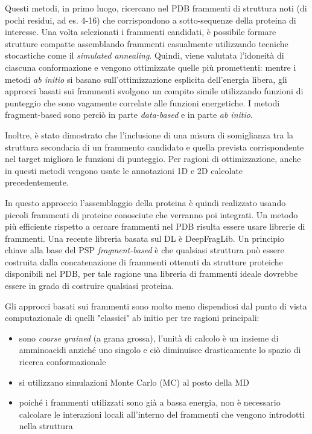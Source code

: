 {Questi metodi, in primo luogo, ricercano nel PDB frammenti di struttura noti (di pochi residui, ad es. 4-16) che corrispondono a sotto-sequenze della proteina di interesse. Una volta selezionati i frammenti candidati, è possibile formare strutture compatte assemblando frammenti casualmente utilizzando tecniche stocastiche come il \textit{simulated annealing}. Quindi, viene valutata l'idoneità di ciascuna conformazione e vengono ottimizzate quelle più promettenti: mentre i metodi \textit{ab initio} si basano sull'ottimizzazione esplicita dell'energia libera, gli approcci basati sui frammenti svolgono un compito simile utilizzando funzioni di punteggio che sono vagamente correlate alle funzioni energetiche\supercite{abbass2020enhancing}. I metodi fragment-based sono perciò in parte \textit{data-based} e in parte \textit{ab initio}.

\par Inoltre, è stato dimostrato che l'inclusione di una misura di somiglianza tra la struttura secondaria di un frammento candidato e quella prevista corrispondente nel target migliora le funzioni di punteggio. Per ragioni di ottimizzazione, anche in questi metodi vengono usate le annotazioni 1D e 2D calcolate precedentemente.

\par In questo approccio l'assemblaggio della proteina è quindi realizzato usando piccoli frammenti di proteine conosciute che verranno poi integrati. Un metodo più efficiente rispetto a cercare frammenti nel PDB risulta essere usare librerie di frammenti. Una recente libreria basata sul DL è DeepFragLib. Un principio chiave alla base del PSP \textit{fragment-based} è che qualsiasi struttura può essere costruita dalla concatenazione di frammenti ottenuti da strutture proteiche disponibili nel PDB, per tale ragione una libreria di frammenti ideale dovrebbe essere in grado di costruire qualsiasi proteina. \\


\par Gli approcci basati sui frammenti sono molto meno dispendiosi dal punto di vista computazionale di quelli "classici" ab initio per tre ragioni principali\supercite{abbass2020enhancing}: 
\begin{itemize}
	\item sono \textit{coarse grained} (a grana grossa), l'unità di calcolo è un insieme di amminoacidi anziché uno singolo e ciò diminuisce drasticamente lo spazio di ricerca conformazionale
	\item si utilizzano simulazioni Monte Carlo (MC) al posto della MD
	\item poiché i frammenti utilizzati sono già a bassa energia, non è necessario calcolare le interazioni locali all'interno del frammenti che vengono introdotti nella struttura
\end{itemize}

}
